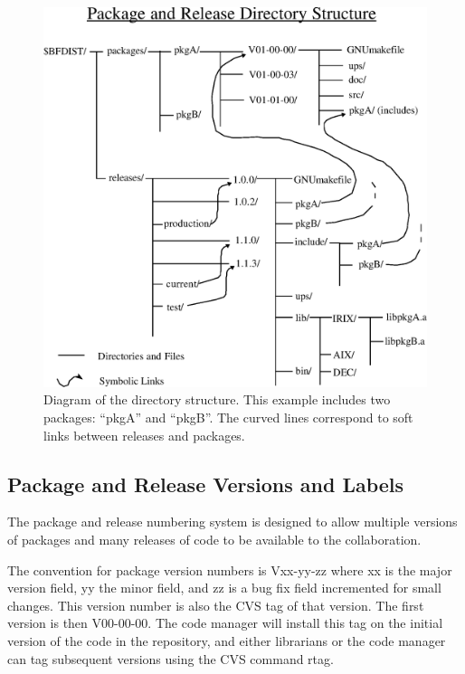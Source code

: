 \documentclass[12pt]{article}
\begin{document}
\begin{figure}[tbh]
\begin{center}
\includegraphics[width=4.5in]{run_2_directory.eps}
\end{center}
\caption[Official Release Directory Structure]{ 
Diagram of the directory structure.  This example includes two
packages: 
``pkgA'' and ``pkgB''. 
The curved lines correspond to soft links between 
releases and packages.}
\label{fig_directory}
\end{figure}

\subsection{Package and Release Versions and Labels}
The package and release numbering system is designed to allow multiple versions
of packages and many releases 
of code to be available to the collaboration.

The convention for package version numbers is Vxx-yy-zz where
xx is the major version field, yy the minor field, and zz is a bug fix
field incremented for small changes. This version number is also the 
CVS tag of 
that version. The first version is then V00-00-00.
The code manager will install this tag on the initial version of
the code in the repository, and either librarians or the code manager can tag 
subsequent versions using the CVS command rtag.
\end{document}
